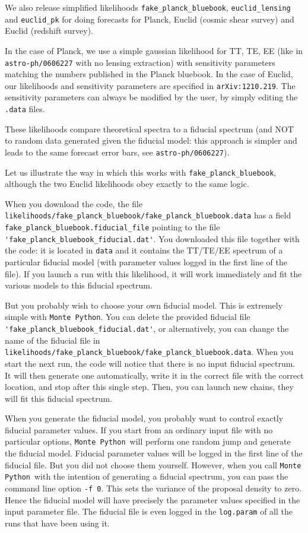 \documentclass[10pt]{article}
\newcommand{\MP}{\texttt{Monte Python}}
\begin{document}
We also release simplified likelihoods \verb?fake_planck_bluebook?, \verb?euclid_lensing? and \verb?euclid_pk? for doing forecasts for Planck, Euclid (cosmic shear survey) and Euclid (redshift survey).

In the case of Planck, we use a simple gaussian likelihood for TT, TE, EE (like in \verb?astro-ph/0606227? with no lensing extraction) with sensitivity parameters matching the numbers published in the Planck bluebook. In the case of Euclid, our likelihoods and sensitivity parameters are specified in \verb?arXiv:1210.219?. The sensitivity parameters can always be modified by the user, by simply editing the \verb?.data? files.

These likelihoods compare theoretical spectra to a fiducial spectrum (and NOT to random data generated given the fiducial model: this approach is simpler and leads to the same forecast error bars, see \verb?astro-ph/0606227?).

Let us illustrate the way in which this works with \verb?fake_planck_bluebook?, although the two Euclid likelihoods obey exactly to the same logic.


When you download the code, the file \verb?likelihoods/fake_planck_bluebook/fake_planck_bluebook.data? has a field
\verb?fake_planck_bluebook.fiducial_file? pointing to the file\\
\verb?'fake_planck_bluebook_fiducial.dat'?. You downloaded this file together
with the code: it is located in \verb?data? and it contains the TT/TE/EE
spectrum of a particular fiducial model (with parameter values logged in the
first line of the file). If you launch a run with this likelihood, it will work
immediately and fit the various models to this fiducial spectrum.

But you probably wish to choose your own fiducial model. This is extremely
simple with \MP. You can delete the provided fiducial
file\\\verb?'fake_planck_bluebook_fiducial.dat'?, or alternatively,
you can change the name of the fiducial file in\\
\verb?likelihoods/fake_planck_bluebook/fake_planck_bluebook.data?. When you
start the next run, the code will notice that there is no input fiducial
spectrum. It will then generate one automatically, write it in the correct file
with the correct location, and stop after this single step. Then, you can
launch new chains, they will fit this fiducial spectrum. 

When you generate the fiducial model, you probably want to control exactly fiducial parameter values. If you start from an ordinary input file with no particular options, \MP~will perform one random jump and generate the fiducial model. Fiducial parameter values will be logged in the first line of the fiducial file. But you did not choose them yourself. However, when you call \MP~with the intention of generating a fiducial spectrum, you can pass the command line option \verb?-f 0?. This sets the variance of the proposal density to zero. Hence the fiducial model will have precisely the parameter values specified in the input parameter file. The fiducial file is even logged in the \verb?log.param? of all the runs that have been using it.
\end{document}
